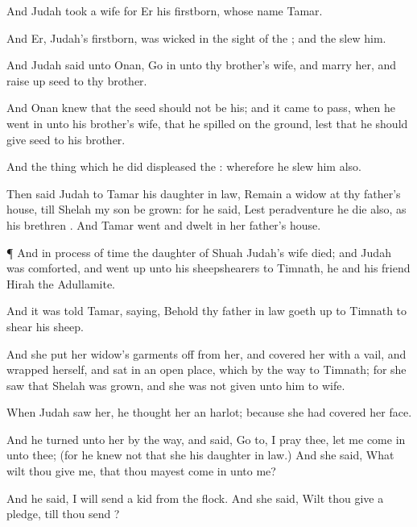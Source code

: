 {And
Judah
took a
wife for
Er his
firstborn, whose
name
{}
Tamar.

And
Er,
Judah’s
firstborn, was
wicked in the
sight of the
{}; and the
{}
slew him.

And
Judah
said unto
Onan, Go
in unto thy
brother’s
wife, and
marry her, and raise
up
seed to thy
brother.

And
Onan
knew that the
seed should not be his; and it came to pass,
when he went
in unto his
brother’s
wife, that he
spilled
{} on the
ground,
lest that he should
give
seed to his
brother.

And the thing
which he
did
displeased the
{}: wherefore he
slew him also.

Then
said
Judah to
Tamar his daughter in
law,
Remain a
widow at thy
father’s
house, till
Shelah my
son be
grown: for he
said, Lest peradventure he
die also, as his
brethren
{}. And
Tamar
went and
dwelt in her
father’s
house.


\par }{\PP {}¶ And in
process of
time the
daughter of
Shuah
Judah’s
wife
died; and
Judah was
comforted, and went
up unto his
sheepshearers to
Timnath, he and his
friend
Hirah the
Adullamite.

And it was
told
Tamar,
saying, Behold thy father in
law goeth
up to
Timnath to
shear his
sheep.

And she
put her
widow’s
garments
off from her, and covered
her with a
vail, and wrapped
herself, and sat
in an
open
place, which
{} by the
way to
Timnath; for she
saw that
Shelah was
grown, and she was not
given unto him to
wife.

When
Judah saw
her, he
thought her
{} an
harlot; because she had
covered her
face.

And he
turned unto her by the
way, and
said, Go
to, I pray thee, let me come
in unto thee; (for he
knew not that she
{} his daughter in
law.) And she
said, What wilt thou
give me, that thou mayest come
in unto me?

And he
said, I will
send
{} a
kid from the
flock. And she
said, Wilt thou
give
{} a
pledge, till thou
send
{}?

}
